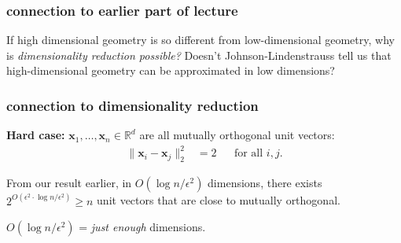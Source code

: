 \documentclass[compress]{beamer}
\newcommand{\bv}[1]{\mathbf{#1}}
\newcommand{\R}{\mathbb{R}}
\begin{document}
\begin{frame}
	\frametitle{connection to earlier part of lecture}
	If high dimensional geometry is so different from low-dimensional geometry, why is \emph{dimensionality reduction possible?} Doesn't Johnson-Lindenstrauss tell us that high-dimensional geometry can be approximated in low dimensions?
\end{frame}

\begin{frame}
	\frametitle{connection to dimensionality reduction}
	\textbf{Hard case:} $\bv{x}_1, \ldots, \bv{x}_n \in \R^d$ are all mutually orthogonal unit vectors: 
	\begin{align*}
		\|\bv{x}_i - \bv{x}_j\|_2^2 &= 2 & &\text{for all $i,j$.}  
	\end{align*}
	
	From our result earlier, in $O(\log n /\epsilon^2)$ dimensions, there exists $2^{O(\epsilon^2\cdot \log n /\epsilon^2)} \geq n $ unit vectors that are close to mutually orthogonal.
	
	$O(\log n /\epsilon^2)$ = \emph{just enough} dimensions. 
\end{frame}
\end{document}
